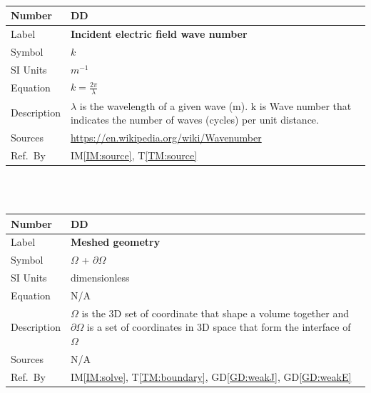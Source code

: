 \documentclass[12pt]{article}
\newcommand{\colBwidth}{0.82\textwidth} \newcommand{\colCwidth}{0.1\textwidth}
\newcounter{defnum} %
\newcounter{datadefnum} %
\begin{document}
	~\newline
	
	\noindent \begin{minipage}{\textwidth} \renewcommand*{\arraystretch}{1.5}
		\begin{tabular}{| p{\colAwidth} | p{\colBwidth}|} \hline \rowcolor[gray]{0.9}
			Number& DD{datadefnum}\thedatadefnum \label{DD:wavenumber}\\
			\hline Label& \bf Incident electric field wave number\\ \hline Symbol &$k$\\
			\hline %
			SI Units & $m^{-1}$\\ \hline Equation&$k=\frac{2\pi}{\lambda}$\\ \hline
			Description & $\lambda$ is the wavelength of a given wave (m). k is Wave
			number that indicates the  number of waves (cycles) per unit distance. \\
			\hline Sources& \url{https://en.wikipedia.org/wiki/Wavenumber} \\ \hline Ref.\
			By & IM\ref{IM:source}, T\ref{TM:source} \\ \hline \end{tabular}
	\end{minipage}\\
	
	
	
	~\newline
	
	\noindent \begin{minipage}{\textwidth} \renewcommand*{\arraystretch}{1.5}
		\begin{tabular}{| p{\colAwidth} | p{\colBwidth}|} \hline \rowcolor[gray]{0.9}
			Number& DD{datadefnum}\thedatadefnum \label{DD:omega}\\ \hline
			Label& \bf Meshed geometry \\ \hline Symbol &$\Omega$ + $\partial \Omega$\\
			\hline %
			SI Units &dimensionless\\ \hline Equation& N/A \\ \hline Description &
			$\Omega$ is the 3D set of coordinate that shape a volume together and
			$\partial \Omega$ is a set of coordinates in 3D space that form the interface
			of $\Omega$ \\ \hline Sources& N/A\\ \hline Ref.\ By & IM\ref{IM:solve},
			T\ref{TM:boundary}, GD\ref{GD:weakJ}, GD\ref{GD:weakE} \\ \hline \end{tabular}
	\end{minipage}\\
	
\end{document}
